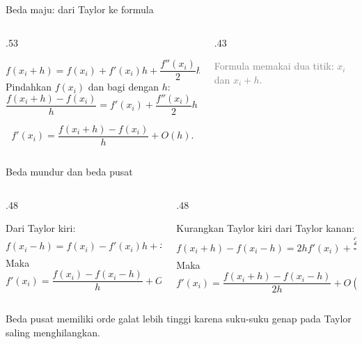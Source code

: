 \documentclass[aspectratio=169,10pt]{beamer}
\newcommand{\smallgray}[1]{\textcolor{GrayText}{\scriptsize #1}}
\begin{document}
\begin{frame}{Beda maju: dari Taylor ke formula}
\scriptsize
\begin{columns}[T,totalwidth=\textwidth]
\begin{column}{.53\textwidth}
\begin{bluebox}
\[
f(x_i+h)=f(x_i)+f'(x_i)h+\frac{f''(x_i)}{2}h^2+O(h^3).
\]
Pindahkan $f(x_i)$ dan bagi dengan $h$:
\[
\frac{f(x_i+h)-f(x_i)}{h}=f'(x_i)+\frac{f''(x_i)}{2}h+O(h^2).
\]
\end{bluebox}
\begin{orangebox}[Formula]
\[
f'(x_i)=\frac{f(x_i+h)-f(x_i)}{h}+O(h).
\]
\end{orangebox}
\end{column}
\begin{column}{.43\textwidth}
\smallgray{Formula memakai dua titik: $x_i$ dan $x_i+h$.}
\end{column}
\end{columns}
\end{frame}

\begin{frame}{Beda mundur dan beda pusat}
\scriptsize
\begin{columns}[T,totalwidth=\textwidth]
\begin{column}{.48\textwidth}
\begin{orangebox}
Dari Taylor kiri:
\[
f(x_i-h)=f(x_i)-f'(x_i)h+\frac{f''(x_i)}{2}h^2+O(h^3).
\]
Maka
\[
f'(x_i)=\frac{f(x_i)-f(x_i-h)}{h}+O(h).
\]
\end{orangebox}
\end{column}
\begin{column}{.48\textwidth}
\begin{purplebox}
Kurangkan Taylor kiri dari Taylor kanan:
\[
f(x_i+h)-f(x_i-h)=2hf'(x_i)+\frac{2h^3}{3!}f^{(3)}(x_i)+O(h^5).
\]
Maka
\[
f'(x_i)=\frac{f(x_i+h)-f(x_i-h)}{2h}+O(h^2).
\]
\end{purplebox}
\end{column}
\end{columns}
\vspace{1mm}
\begin{greenbox}[Kesimpulan]
Beda pusat memiliki orde galat lebih tinggi karena suku-suku genap pada Taylor saling menghilangkan.
\end{greenbox}
\end{frame}
\end{document}
